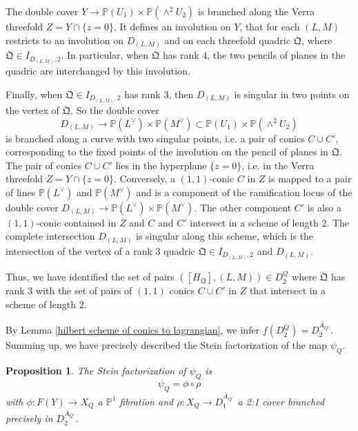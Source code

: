 \documentclass[a4paper,11pt]{amsart}
\newtheorem{prop}[thm]{Proposition}
\theoremstyle{definition}
\numberwithin{equation}{section}
\numberwithin{equation}{section} \theoremstyle{definition}
\begin{document}
The double cover $Y\to {{\mathbb{P}}}(U_1)\times {{\mathbb{P}}}(\wedge^2 U_2)$ is branched along the Verra threefold $Z=Y\cap \{z=0\}$.  It 
defines an involution on $Y$, that for each $(L,M)$ restricts to an involution on $D_{(L,M)}$ and on each threefold quadric ${\mathfrak{Q}}$, where
 ${\mathfrak{Q}}\in I_{D_{(L,M)},2}$.
In particular, when ${\mathfrak{Q}}$ has rank $4$, the two pencils of planes in the quadric  are interchanged by this  involution. 

Finally, when ${\mathfrak{Q}}\in I_{D_{(L,M)},2}$ has rank $3$, then  $D_{(L,M)}$ is singular in two points on the vertex of ${\mathfrak{Q}}$.  So the double cover 
$$D_{(L,M)}\to {{\mathbb{P}}}(L^{\vee})\times {{\mathbb{P}}}(M^{\vee})\subset {{\mathbb{P}}}( U_1)\times {{\mathbb{P}}}(\wedge^2 U_2)$$
is branched along a curve with two singular points, i.e. a pair of conics $C\cup C'$, corresponding to the fixed points of the involution on the pencil of planes in ${\mathfrak{Q}}$.  The pair of conics $C\cup C'$ lies in the hyperplane $\{z=0\}$, i.e. in the Verra threefold $Z=Y\cap \{z=0\}$.   Conversely,  a $(1,1)$-conic $C$ in $Z$ is mapped to a pair of lines ${{\mathbb{P}}}(L^{\vee})$ and $ {{\mathbb{P}}}(M^{\vee})$ and is a component of the ramification locus of the double cover $D_{(L,M)}\to {{\mathbb{P}}}(L^{\vee})\times {{\mathbb{P}}}(M^{\vee})$.  The other component $C'$ is also a $(1,1)$-conic contained in $Z$ and $C$ and $C'$ intersect in a scheme of length $2$.  The complete intersection $D_{(L,M)}$ is singular along this scheme, which is the intersection of  the vertex of a rank $3$ quadric ${\mathfrak{Q}}\in I_{D_{(L,M)},2}$ and $D_{(L,M)}$.  

Thus, we have identified the  set of pairs $([H_{\mathfrak{Q}}],(L,M))\in D^Q_2$ where ${\mathfrak{Q}}$ has rank $3$ with the set of pairs of $(1,1)$ conics $C\cup  C'$ in $Z$ that intersect in a scheme of length $2$.  
  
By Lemma \ref{hilbert scheme of conics to lagrangian}, we 
 infer $f(D^Q_2)={D}^{\bar{A}_{Q'}}_2$. 
Summing up, we have precisely described the Stein factorization of the map  $\psi_Q$.
\begin{prop} The Stein factorization of $\psi_Q$ is 
$$ \psi_Q=\phi \circ \rho$$
with $\phi:F(Y)\to X_Q$ a $\mathbb{P}^1$ fibration  and $\rho: X_Q\to {D}^{\bar{A}_{Q'}}_1 $ a 2:1 cover branched  precisely in
${D}^{\bar{A}_{Q'}}_2$.
\end{prop}
\end{document}
